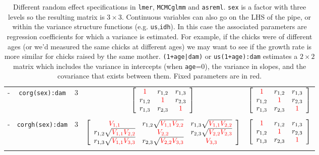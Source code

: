 \documentclass{article}
\begin{document}
\begin{landscape}
\begin{table}
\begin{tabular}{ccccc}
\\
-&\texttt{corg(sex):dam}&3&
$\left[
\begin{array}{ccc}
{\color{red} 1}&r_{1,2}&r_{1,3}\\
r_{1,2}&{\color{red} 1}&r_{2,3}\\
r_{1,3}&r_{2,3}&{\color{red} 1}\\
\end{array}
\right]$
&
$\left[
\begin{array}{ccc}
{\color{red} 1}&r_{1,2}&r_{1,3}\\
r_{1,2}&{\color{red} 1}&r_{2,3}\\
r_{1,3}&r_{2,3}&{\color{red} 1}\\
\end{array}
\right]$\\
\\
-&\texttt{corgh(sex):dam}&3&
$\left[
\begin{array}{ccc}
{\color{red} V_{1,1}}&r_{1,2}\sqrt{{\color{red} V_{1,1}V_{2,2}}}&r_{1,3}\sqrt{{\color{red} V_{1,1}V_{2,2}}}\\
r_{1,2}\sqrt{{\color{red} V_{1,1}V_{2,2}}}&{\color{red} V_{2,2}}&r_{2,3}\sqrt{{\color{red} V_{2,2}V_{2,3}}}\\
r_{1,3}\sqrt{{\color{red} V_{1,1}V_{3,3}}}&r_{2,3}\sqrt{{\color{red} V_{2,2}V_{3,3}}}&{\color{red} V_{3,3}}\\
\end{array}
\right]$
&
$\left[
\begin{array}{ccc}
{\color{red} 1}&r_{1,2}&r_{1,3}\\
r_{1,2}&{\color{red} 1}&r_{2,3}\\
r_{1,3}&r_{2,3}&{\color{red} 1}\\
\end{array}
\right]$\\
\\
\hline
\end{tabular}
\caption{Different random effect specifications in \texttt{lmer}, \texttt{MCMCglmm} and \texttt{asreml}. \texttt{sex} is a factor with three levels so the resulting matrix is $3\times3$. Continuous variables can also go on the LHS of the pipe, or within the variance structure functions (e.g. \texttt{us},\texttt{idh}). In this case the associated parameters are regression coefficients for which a variance is estimated. For example, if the chicks were of different ages (or we'd measured the same chicks at different ages) we may want to see if the growth rate is more similar for chicks raised by the same mother. \texttt{(1+age|dam)} or \texttt{us(1+age):dam} estimates a $2\times2$ matrix which includes the variance in intercepts (when \texttt{age}=0), the variance in slopes, and the covariance that exists between them. Fixed parameters are in red.}
\label{rspec}
\end{table}
\end{landscape}
\end{document}
